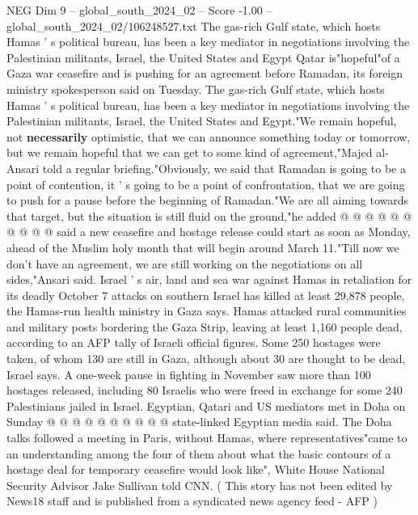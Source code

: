 \begin{textsample}{NEG Dim 9 – global\_south\_2024\_02 – Score -1.00 – global\_south\_2024\_02/106248527.txt}  \label{ex:f9_neg_358}
The gas-rich Gulf state, which hosts Hamas ' s political bureau, has been a key mediator in negotiations involving the Palestinian militants, Israel, the United States and Egypt Qatar is"hopeful"of a Gaza war ceasefire and is pushing for an agreement before Ramadan, its foreign ministry spokesperson said on Tuesday.
The gas-rich Gulf state, which hosts Hamas ' s political bureau, has been a key mediator in negotiations involving the Palestinian militants, Israel, the United States and Egypt."We remain hopeful, not \textbf{necessarily} optimistic, that we can announce something today or tomorrow, but we remain hopeful that we can get to some kind of agreement,"Majed al-Ansari told a regular briefing."Obviously, we said that Ramadan is going to be a point of contention, it ' s going to be a point of confrontation, that we are going to push for a pause before the beginning of Ramadan."We are all aiming towards that target, but the situation is still fluid on the ground,"he added @ @ @ @ @ @ @ @ @ @ said a new ceasefire and hostage release could start as soon as Monday, ahead of the Muslim holy month that will begin around March 11."Till now we don't have an agreement, we are still working on the negotiations on all sides,"Ansari said.
Israel ' s air, land and sea war against Hamas in retaliation for its deadly October 7 attacks on southern Israel has killed at least 29,878 people, the Hamas-run health ministry in Gaza says.
Hamas attacked rural communities and military posts bordering the Gaza Strip, leaving at least 1,160 people dead, according to an AFP tally of Israeli official figures.
Some 250 hostages were taken, of whom 130 are still in Gaza, although about 30 are thought to be dead, Israel says.
A one-week pause in fighting in November saw more than 100 hostages released, including 80 Israelis who were freed in exchange for some 240 Palestinians jailed in Israel.
Egyptian, Qatari and US mediators met in Doha on Sunday @ @ @ @ @ @ @ @ @ @ state-linked Egyptian media said.
The Doha talks followed a meeting in Paris, without Hamas, where representatives"came to an understanding among the four of them about what the basic contours of a hostage deal for temporary ceasefire would look like", White House National Security Advisor Jake Sullivan told CNN. ( This story has not been edited by News18 staff and is published from a syndicated news agency feed - AFP )

\end{textsample}
